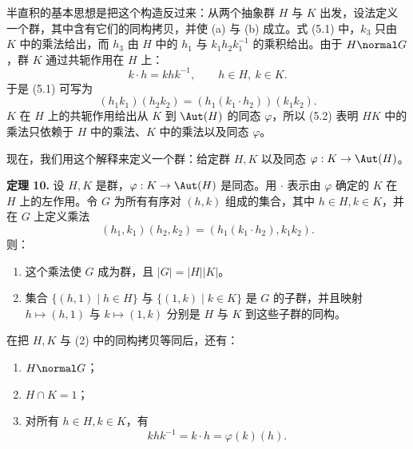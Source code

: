 半直积的基本思想是把这个构造反过来：从两个抽象群 $H$ 与 $K$ 出发，设法定义一个群，其中含有它们的同构拷贝，并使 (a) 与 (b) 成立。式 (5.1) 中，$k_3$ 只由 $K$ 中的乘法给出，而 $h_3$ 由 $H$ 中的 $h_1$ 与 $k_1h_2k_1^{-1}$ 的乘积给出。由于 $H\normal G$，群 $K$ 通过共轭作用在 $H$ 上：
\[
  k\cdot h=khk^{-1},
\qquad h\in H,
\ k\in K.
\]
于是 (5.1) 可写为
\[
  (h_1k_1)(h_2k_2)=(h_1(k_1\cdot h_2))(k_1k_2). \tag{5.2}
\]
$K$ 在 $H$ 上的共轭作用给出从 $K$ 到 $\Aut(H)$ 的同态 $\varphi$，所以 (5.2) 表明 $HK$ 中的乘法只依赖于 $H$ 中的乘法、$K$ 中的乘法以及同态 $\varphi$。

现在，我们用这个解释来定义一个群：给定群 $H,K$ 以及同态 $\varphi:K\to\Aut(H)$。

\medskip
\noindent\textbf{定理 10.} 设 $H,K$ 是群，$\varphi:K\to\Aut(H)$ 是同态。用 $\cdot$ 表示由 $\varphi$ 确定的 $K$ 在 $H$ 上的左作用。令 $G$ 为所有有序对 $(h,k)$ 组成的集合，其中 $h\in H,k\in K$，并在 $G$ 上定义乘法
\[
  (h_1,k_1)(h_2,k_2)=(h_1(k_1\cdot h_2),k_1k_2).
\]
则：
\begin{enumerate}[label=(\arabic*)]
  \item 这个乘法使 $G$ 成为群，且 $|G|=|H||K|$。
  \item 集合 $\{(h,1)\mid h\in H\}$ 与 $\{(1,k)\mid k\in K\}$ 是 $G$ 的子群，并且映射 $h\mapsto(h,1)$ 与 $k\mapsto(1,k)$ 分别是 $H$ 与 $K$ 到这些子群的同构。
\end{enumerate}
在把 $H,K$ 与 (2) 中的同构拷贝等同后，还有：
\begin{enumerate}[label=(\arabic*),resume]
  \item $H\normal G$；
  \item $H\cap K=1$；
  \item 对所有 $h\in H,k\in K$，有
  \[
    khk^{-1}=k\cdot h=\varphi(k)(h).
  \]
\end{enumerate}


